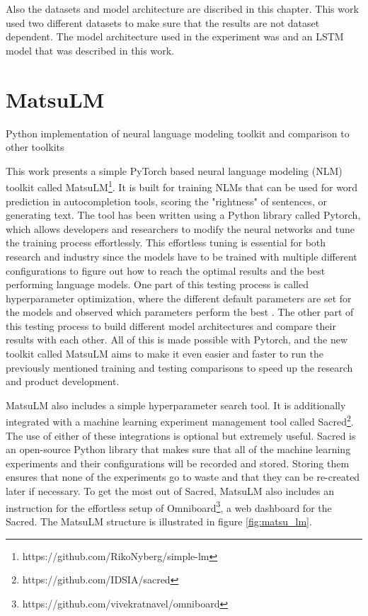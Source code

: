 Also the datasets and model architecture are discribed in this chapter. This work used two different datasets to make sure that the results are not dataset dependent. The model architecture used in the experiment was and an LSTM model that was described in this work.

\section{MatsuLM}
\label{sec:MatsuLM}
Python implementation of neural language modeling toolkit and comparison to other toolkits 

This work presents a simple PyTorch based neural language modeling (NLM) toolkit called MatsuLM\footnote{https://github.com/RikoNyberg/simple-lm}. It is built for training NLMs that can be used for word prediction in autocompletion tools, scoring the "rightness" of sentences, or generating text. The tool has been written using a Python library called Pytorch, which allows developers and researchers to modify the neural networks and tune the training process effortlessly. This effortless tuning is essential for both research and industry since the models have to be trained with multiple different configurations to figure out how to reach the optimal results and the best performing language models. One part of this testing process is called hyperparameter optimization, where the different default parameters are set for the models and observed which parameters perform the best \parencite{bergstra2011algorithms,falkner2018bohb}. The other part of this testing process to build different model architectures and compare their results with each other. All of this is made possible with Pytorch, and the new toolkit called MatsuLM aims to make it even easier and faster to run the previously mentioned training and testing comparisons to speed up the research and product development. 

MatsuLM also includes a simple hyperparameter search tool. It is additionally integrated with a machine learning experiment management tool called Sacred\footnote{https://github.com/IDSIA/sacred}. The use of either of these integrations is optional but extremely useful. Sacred is an open-source Python library that makes sure that all of the machine learning experiments and their configurations will be recorded and stored. Storing them ensures that none of the experiments go to waste and that they can be re-created later if necessary. To get the most out of Sacred, MatsuLM also includes an instruction for the effortless setup of Omniboard\footnote{https://github.com/vivekratnavel/omniboard}, a web dashboard for the Sacred. The MatsuLM structure is illustrated in figure \ref{fig:matsu_lm}.

